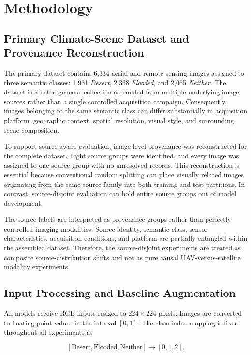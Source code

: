 \section{Methodology}
\label{sec:methodology}

\subsection{Primary Climate-Scene Dataset and Provenance Reconstruction}

The primary dataset contains 6,334 aerial and remote-sensing images
assigned to three semantic classes: 1,931 \emph{Desert}, 2,338
\emph{Flooded}, and 2,065 \emph{Neither}. The dataset is a heterogeneous
collection assembled from multiple underlying image sources rather than
a single controlled acquisition campaign. Consequently, images belonging
to the same semantic class can differ substantially in acquisition
platform, geographic context, spatial resolution, visual style, and
surrounding scene composition.

To support source-aware evaluation, image-level provenance was
reconstructed for the complete dataset. Eight source groups were
identified, and every image was assigned to one source group with no
unresolved records. This reconstruction is essential because conventional
random splitting can place visually related images originating from the
same source family into both training and test partitions. In contrast,
source-disjoint evaluation can hold entire source groups out of model
development.

The source labels are interpreted as provenance groups rather than
perfectly controlled imaging modalities. Source identity, semantic class,
sensor characteristics, acquisition conditions, and platform are partially
entangled within the assembled dataset. Therefore, the source-disjoint
experiments are treated as composite source-distribution shifts and not
as pure causal UAV-versus-satellite modality experiments.

\subsection{Input Processing and Baseline Augmentation}

All models receive RGB inputs resized to \(224\times224\) pixels. Images
are converted to floating-point values in the interval \([0,1]\). The
class-index mapping is fixed throughout all experiments as

\[
[\text{Desert},\text{Flooded},\text{Neither}]
\rightarrow
[0,1,2].
\]

